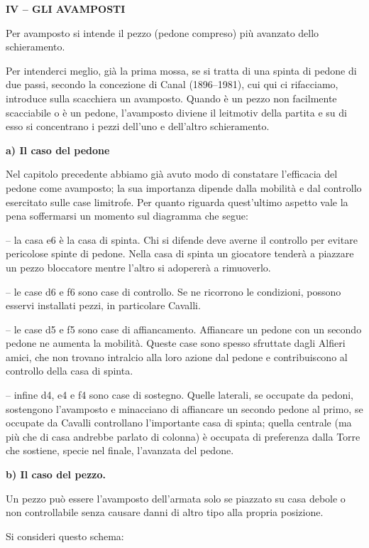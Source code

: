 \textbf{IV -- GLI AVAMPOSTI}

Per avamposto si intende il pezzo (pedone compreso) più avanzato dello
schieramento.

Per intenderci meglio, già la prima mossa, se si tratta di una spinta di
pedone di due passi, secondo la concezione di Canal (1896--1981), cui
qui ci rifacciamo, introduce sulla scacchiera un avamposto. Quando è un
pezzo non facilmente scacciabile o è un pedone, l'avamposto diviene il
leitmotiv della partita e su di esso si concentrano i pezzi dell'uno e
dell'altro schieramento.

\textbf{a) Il caso del pedone}

Nel capitolo precedente abbiamo già avuto modo di constatare l'efficacia
del pedone come avamposto; la sua importanza dipende dalla mobilità e
dal controllo esercitato sulle case limitrofe. Per quanto riguarda
quest'ultimo aspetto vale la pena soffermarsi un momento sul diagramma
che segue:


-- la casa e6 è la casa di spinta. Chi si difende deve averne il
controllo per evitare pericolose spinte di pedone. Nella casa di spinta
un giocatore tenderà a piazzare un pezzo bloccatore mentre l'altro si
adopererà a rimuoverlo.

-- le case d6 e f6 sono case di controllo. Se ne ricorrono le
condizioni, possono esservi installati pezzi, in particolare Cavalli.

-- le case d5 e f5 sono case di affiancamento. Affiancare un pedone con
un secondo pedone ne aumenta la mobilità. Queste case sono spesso
sfruttate dagli Alfieri amici, che non trovano intralcio alla loro
azione dal pedone e contribuiscono al controllo della casa di spinta.

-- infine d4, e4 e f4 sono case di sostegno. Quelle laterali, se
occupate da pedoni, sostengono l'avamposto e minacciano di affiancare un
secondo pedone al primo, se occupate da Cavalli controllano l'importante
casa di spinta; quella centrale (ma più che di casa andrebbe parlato di
colonna) è occupata di preferenza dalla Torre che sostiene, specie nel
finale, l'avanzata del pedone.

\textbf{b) Il caso del pezzo.}

Un pezzo può essere l'avamposto dell'armata solo se piazzato su casa
debole o non controllabile senza causare danni di altro tipo alla
propria posizione.

Si consideri questo schema:

